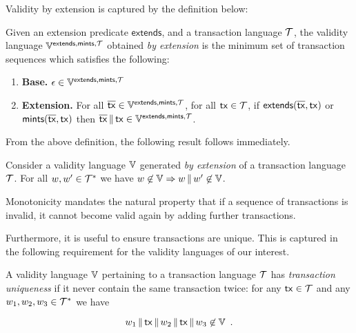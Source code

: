 Validity by extension is captured by the definition below:

\begin{definition}\label{def:lang-extension}
  Given an extension predicate $\textsf{extends}$, and a transaction language
  $\mathcal{T}$, the validity language
  $\mathbb{V}^{\textsf{extends},\textsf{mints},\mathcal{T}}$ obtained \emph{by extension} is
  the minimum set of transaction sequences which satisfies the following:

  \begin{enumerate}
    \item \textbf{Base.}
          $\epsilon \in \mathbb{V}^{\textsf{extends},\textsf{mints},\mathcal{T}}$
    \item \textbf{Extension.}
          For all $\overline{\mathsf{tx}} \in \mathbb{V}^{\textsf{extends},\textsf{mints},\mathcal{T}}$, for all
          $\mathsf{tx} \in \mathcal{T}$, if
          $\textsf{extends}(\overline{\mathsf{tx}}, \mathsf{tx})$ or $\textsf{mints}(\overline{\mathsf{tx}}, \mathsf{tx})$ then
          $\overline{\mathsf{tx}} \,\|\, \mathsf{tx} \in \mathbb{V}^{\textsf{extends},\textsf{mints},\mathcal{T}}$.
  \end{enumerate}
\end{definition}

From the above definition, the following result follows immediately.

\begin{lemma}
  Consider a validity language $\mathbb{V}$ generated \emph{by extension} of a
  transaction language $\mathcal{T}$. For all $w,w'\in \mathcal{T}^*$ we have
  $w\not\in\mathbb{V} \Rightarrow w\,\|\, w'\not\in\mathbb{V}$.
\end{lemma}

Monotonicity mandates the natural property that if a sequence of transactions is
invalid, it cannot become valid again by adding further transactions.

Furthermore, it is useful to ensure transactions are unique. This is captured in
the following requirement for the validity languages of our interest.

\begin{definition}\label{def:trans-uniqueness}
  A validity language $\mathbb{V}$ pertaining to a transaction language $\mathcal{T}$
  has \emph{transaction uniqueness} if it never contain the same transaction
  twice: for any $\mathsf{tx}\in \mathcal{T}$ and any
  $w_1,w_2,w_3\in \mathcal{T}^*$ we have

  \[ w_1\,\|\,\mathsf{tx}\,\|\,
  w_2\,\|\,\mathsf{tx}\,\|\, w_3\not\in\mathbb{V} \,~. \]
\end{definition}

